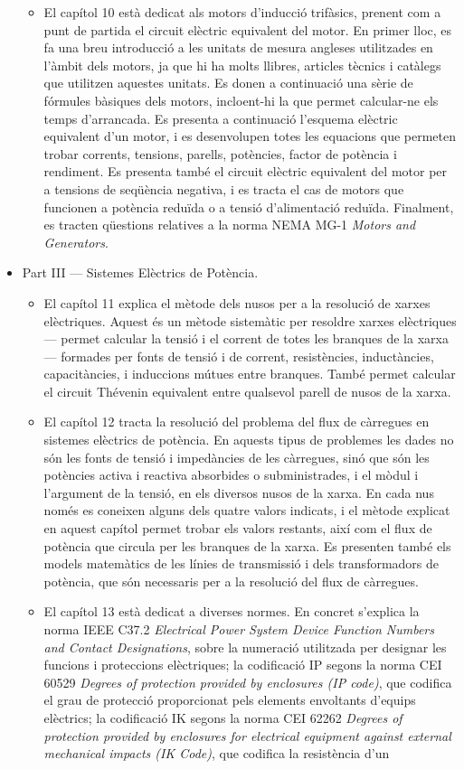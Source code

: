 \begin{itemize}
\begin{itemize}
			\item El capítol 10 està dedicat als motors d'inducció trifàsics, prenent com a punt de partida el circuit elèctric equivalent del motor. En primer lloc, es fa una breu introducció  a les unitats de mesura angleses utilitzades en l'àmbit dels motors, ja que hi ha molts llibres, articles tècnics i catàlegs que utilitzen aquestes unitats. Es donen a continuació una sèrie de fórmules bàsiques dels motors, incloent-hi la que permet calcular-ne els temps d'arrancada. Es presenta a continuació l'esquema elèctric equivalent d'un motor, i es desenvolupen totes les equacions que permeten trobar   corrents, tensions, parells, potències, factor de potència i rendiment. Es presenta també el circuit elèctric equivalent del motor per a tensions 
			de seqüència negativa, i es tracta el cas de motors que funcionen a potència reduïda o a tensió d'alimentació reduïda. Finalment,  es tracten qüestions relatives a la norma NEMA MG-1 \textit{Motors and Generators}. 
		\end{itemize}
		\item Part III --- Sistemes Elèctrics de Potència. 
		\begin{itemize}
			\item El capítol 11 explica el mètode dels nusos per a la resolució de xarxes elèctriques. Aquest és un mètode sistemàtic per resoldre xarxes elèctriques --- permet calcular la tensió i el corrent de totes les branques de la xarxa --- formades per fonts de tensió i de corrent, resistències, inductàncies, capacitàncies, i induccions mútues entre branques. També permet calcular el circuit Thévenin equivalent entre qualsevol parell de nusos de la xarxa.
			\item El capítol 12 tracta la resolució del problema del flux de càrregues en sistemes 	elèctrics de potència. En aquests tipus de problemes les dades no són les fonts de tensió i impedàncies de les càrregues, sinó que són les potències activa i reactiva absorbides o subministrades, i el mòdul i l'argument de la tensió, en els diversos nusos de la xarxa. En cada nus només es coneixen alguns dels quatre valors indicats, i el mètode explicat en aquest capítol permet trobar els valors restants, així com el flux de potència que circula per les branques de la xarxa. Es presenten també els models matemàtics de les línies de transmissió i dels transformadors de potència, que són necessaris per a la resolució del flux de càrregues.
			\item El capítol 13 està dedicat a  diverses normes. En concret s'explica la norma IEEE C37.2 \textit{Electrical Power System Device Function Numbers and Contact Designations}, sobre la numeració utilitzada per designar les funcions i proteccions elèctriques; la codificació IP segons la norma CEI 60529 \textit{Degrees of protection provided by enclosures (IP code)}, que codifica el grau de protecció proporcionat pels 			elements envoltants d’equips elèctrics; la codificació IK segons  la norma CEI 62262 \textit{Degrees of protection provided by enclosures for 			electrical equipment against external mechanical impacts (IK Code)}, que  codifica la resistència d’un

\end{itemize}
\end{itemize}
